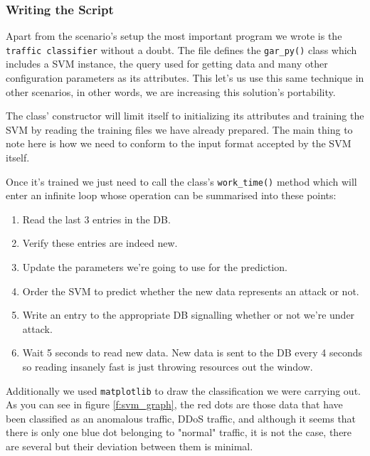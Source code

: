 \documentclass[12pt]{report}
\newcommand{\newpar} {
    \vskip 1cm
}
\begin{document}
\begin{itemize}
{{{{			\subsubsection{Writing the Script}
				Apart from the scenario's setup the most important program we wrote is the \texttt{traffic classifier} without a doubt. The file defines the \texttt{gar_py()} class which includes a SVM instance, the query used for getting data and many other configuration parameters as its attributes. This let's us use this same technique in other scenarios, in other words, we are increasing this solution's portability.
				\newpar
				The class' constructor will limit itself to initializing its attributes and training the SVM by reading the training files we have already prepared. The main thing to note here is how we need to conform to the input format accepted by the SVM itself.
				\newpar
				Once it's trained we just need to call the class's \texttt{work_time()} method which will enter an infinite loop whose operation can be summarised into these points:

				\begin{enumerate}
					\item Read the last 3 entries in the DB.
					\item Verify these entries are indeed new.
					\item Update the parameters we're going to use for the prediction.
					\item Order the SVM to predict whether the new data represents an attack or not.
					\item Write an entry to the appropriate DB signalling whether or not we're under attack.
					\item Wait 5 seconds to read new data. New data is sent to the DB every 4 seconds so reading insanely fast is just throwing resources out the window.
				\end{enumerate}

				Additionally we used \texttt{matplotlib} to draw the classification we were carrying out. As you can see in figure \ref{f:svm_graph}, the red dots are those data that have been classified as an anomalous traffic, DDoS traffic, and although it seems that there is only one blue dot belonging to "normal" traffic, it is not the case, there are several but their deviation between them is minimal.

}}}}
\end{itemize}
\end{document}
